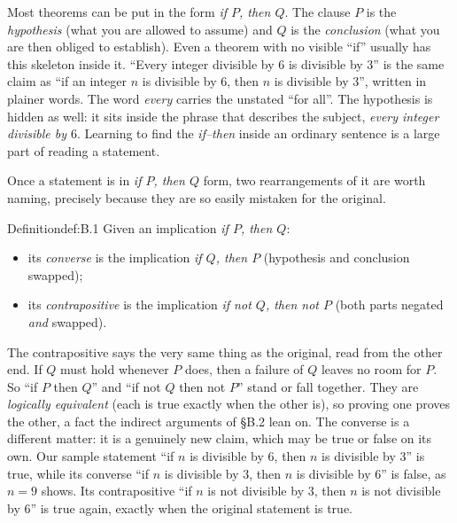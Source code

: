 \documentclass[a4paper,12pt,oneside]{memoir}
\begin{document}
Most theorems can be put in the form \emph{if \(P\), then \(Q\)}. The clause \(P\) is the \emph{hypothesis} (what you are allowed to assume) and \(Q\) is the \emph{conclusion} (what you are then obliged to establish). Even a theorem with no visible “if” usually has this skeleton inside it. “Every integer divisible by \(6\) is divisible by \(3\)” is the same claim as “if an integer \(n\) is divisible by \(6\), then \(n\) is divisible by \(3\)”, written in plainer words. The word \emph{every} carries the unstated “for all”. The hypothesis is hidden as well: it sits inside the phrase that describes the subject, \emph{every integer divisible by \(6\)}. Learning to find the \emph{if–then} inside an ordinary sentence is a large part of reading a statement.

Once a statement is in \emph{if \(P\), then \(Q\)} form, two rearrangements of it are worth naming, precisely because they are so easily mistaken for the original.

\begin{envdefinition}{Definition}{def:B.1}{}
Given an implication \emph{if \(P\), then \(Q\)}:

\begin{itemize}
  \item its \emph{converse} is the implication \emph{if \(Q\), then \(P\)} (hypothesis and conclusion swapped);
  \item its \emph{contrapositive} is the implication \emph{if not \(Q\), then not \(P\)} (both parts negated \emph{and} swapped).
\end{itemize}
\end{envdefinition}
The contrapositive says the very same thing as the original, read from the other end. If \(Q\) must hold whenever \(P\) does, then a failure of \(Q\) leaves no room for \(P\). So “if \(P\) then \(Q\)” and “if not \(Q\) then not \(P\)” stand or fall together. They are \emph{logically equivalent} (each is true exactly when the other is), so proving one proves the other, a fact the indirect arguments of §B.2 lean on. The converse is a different matter: it is a genuinely new claim, which may be true or false on its own. Our sample statement “if \(n\) is divisible by \(6\), then \(n\) is divisible by \(3\)” is true, while its converse “if \(n\) is divisible by \(3\), then \(n\) is divisible by \(6\)” is false, as \(n = 9\) shows. Its contrapositive “if \(n\) is not divisible by \(3\), then \(n\) is not divisible by \(6\)” is true again, exactly when the original statement is true.
\end{document}
